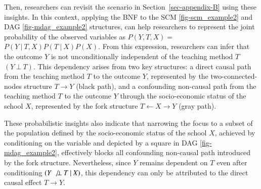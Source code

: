 \documentclass[
  authoryear,
  review,
  1p]{elsarticle}
\begin{document}
Then, researchers can revisit the scenario in
Section~\ref{sec-appendix-B} using these insights. In this context,
applying the BNF to the SCM \ref{fig-scm_example2} and DAG
\ref{fig-mdag_example2} structures, can help researchers to represent
the joint probability of the observed variables as \(P(Y, T, X) =\)
\(P(Y \:|\:T, X) P(T \:|\:X) P(X)\). From this expression, researchers
can infer that the outcome \(Y\) is not unconditionally independent of
the teaching method \(T\) \((Y \:\bot\:T)\). This dependency arises from
two key structures: a direct causal path from the teaching method \(T\)
to the outcome \(Y\), represented by the two-connected-nodes structure
\(T \rightarrow Y\) (black path), and a confounding non-causal path from
the teaching method \(T\) to the outcome \(Y\) through the
socio-economic status of the school \(X\), represented by the fork
structure \(T \leftarrow X \rightarrow Y\) (gray path).

These probabilistic insights also indicate that narrowing the focus to a
subset of the population defined by the socio-economic status of the
school \(X\), achieved by conditioning on the variable and depicted by a
square in DAG \ref{fig-mdag_example2}, effectively blocks all
confounding non-causal path introduced by the fork structure.
Nevertheless, since \(Y\) remains dependent on \(T\) even after
conditioning \((Y \:\not\bot\:T \:|\:X)\), this dependency can only be
attributed to the direct causal effect \(T \rightarrow Y\).
\end{document}
